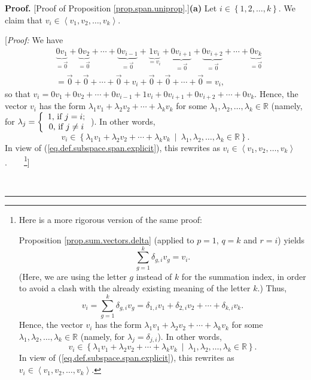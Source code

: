 \documentclass[numbers=enddot,12pt,final,onecolumn,notitlepage]{scrartcl}%
\theoremstyle{definition}
\newenvironment{proof}[1][Proof]{\noindent\textbf{#1.} }{\ \rule{0.5em}{0.5em}}
\let\sumnonlimits\sum
\renewcommand{\sum}{\sumnonlimits\limits}
\begin{document}
\begin{proof}
[Proof of Proposition \ref{prop.span.uniprop}.]\textbf{(a)} Let $i\in\left\{
1,2,\ldots,k\right\}  $. We claim that $v_{i}\in\left\langle v_{1}%
,v_{2},\ldots,v_{k}\right\rangle $.

[\textit{Proof:} We have%
\begin{align*}
&  \underbrace{0v_{1}}_{=\overrightarrow{0}}+\underbrace{0v_{2}}%
_{=\overrightarrow{0}}+\cdots+\underbrace{0v_{i-1}}_{=\overrightarrow{0}%
}+\underbrace{1v_{i}}_{=v_{i}}+\underbrace{0v_{i+1}}_{=\overrightarrow{0}%
}+\underbrace{0v_{i+2}}_{=\overrightarrow{0}}+\cdots+\underbrace{0v_{k}%
}_{=\overrightarrow{0}}\\
&  =\overrightarrow{0}+\overrightarrow{0}+\cdots+\overrightarrow{0}%
+v_{i}+\overrightarrow{0}+\overrightarrow{0}+\cdots+\overrightarrow{0}=v_{i},
\end{align*}
so that $v_{i}=0v_{1}+0v_{2}+\cdots+0v_{i-1}+1v_{i}+0v_{i+1}+0v_{i+2}%
+\cdots+0v_{k}$. Hence, the vector $v_{i}$ has the form $\lambda_{1}%
v_{1}+\lambda_{2}v_{2}+\cdots+\lambda_{k}v_{k}$ for some $\lambda_{1}%
,\lambda_{2},\ldots,\lambda_{k}\in\mathbb{R}$ (namely, for $\lambda
_{j}=\left\{
\begin{array}
[c]{c}%
1\text{, if }j=i\text{;}\\
0\text{, if }j\neq i
\end{array}
\right.  $). In other words,
\[
v_{i}\in\left\{  \lambda_{1}v_{1}+\lambda_{2}v_{2}+\cdots+\lambda_{k}%
v_{k}\ \mid\ \lambda_{1},\lambda_{2},\ldots,\lambda_{k}\in\mathbb{R}\right\}
.
\]
In view of (\ref{eq.def.subspace.span.explicit}), this rewrites as $v_{i}%
\in\left\langle v_{1},v_{2},\ldots,v_{k}\right\rangle $.\ \ \ \ \footnote{Here
is a more rigorous version of the same proof:
\par
Proposition \ref{prop.sum.vectors.delta} (applied to $p=1$, $q=k$ and $r=i$)
yields%
\[
\sum_{g=1}^{k}\delta_{g,i}v_{g}=v_{i}.
\]
(Here, we are using the letter $g$ instead of $k$ for the summation index, in
order to avoid a clash with the already existing meaning of the letter $k$.)
Thus,%
\[
v_{i}=\sum_{g=1}^{k}\delta_{g,i}v_{g}=\delta_{1,i}v_{1}+\delta_{2,i}%
v_{2}+\cdots+\delta_{k,i}v_{k}.
\]
Hence, the vector $v_{i}$ has the form $\lambda_{1}v_{1}+\lambda_{2}%
v_{2}+\cdots+\lambda_{k}v_{k}$ for some $\lambda_{1},\lambda_{2}%
,\ldots,\lambda_{k}\in\mathbb{R}$ (namely, for $\lambda_{j}=\delta_{j,i}$). In
other words,
\[
v_{i}\in\left\{  \lambda_{1}v_{1}+\lambda_{2}v_{2}+\cdots+\lambda_{k}%
v_{k}\ \mid\ \lambda_{1},\lambda_{2},\ldots,\lambda_{k}\in\mathbb{R}\right\}
.
\]
In view of (\ref{eq.def.subspace.span.explicit}), this rewrites as $v_{i}%
\in\left\langle v_{1},v_{2},\ldots,v_{k}\right\rangle $.}]


\end{proof}
\end{document}
